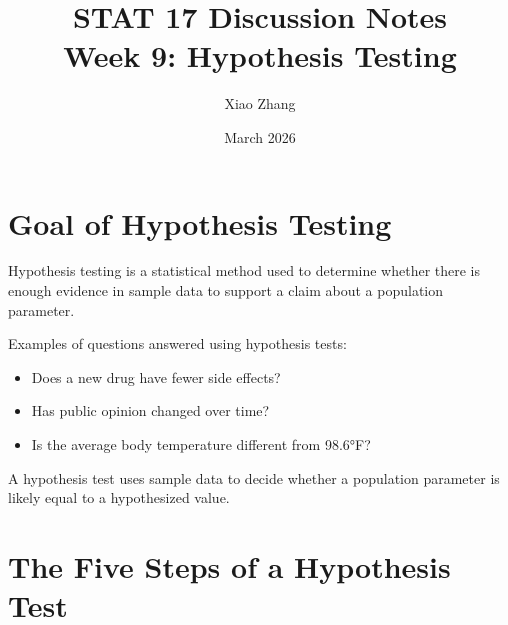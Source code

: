 \documentclass[11pt]{article}
\title{STAT 17 Discussion Notes \\ Week 9: Hypothesis Testing}
\author{Xiao Zhang}
\date{March 2026}
\begin{document}
\maketitle

\section{Goal of Hypothesis Testing}

Hypothesis testing is a statistical method used to determine whether there is enough evidence in sample data to support a claim about a population parameter.

Examples of questions answered using hypothesis tests:

\begin{itemize}
\item Does a new drug have fewer side effects?
\item Has public opinion changed over time?
\item Is the average body temperature different from 98.6°F?
\end{itemize}

A hypothesis test uses sample data to decide whether a population parameter is likely equal to a hypothesized value.

\section{The Five Steps of a Hypothesis Test}
\end{document}
